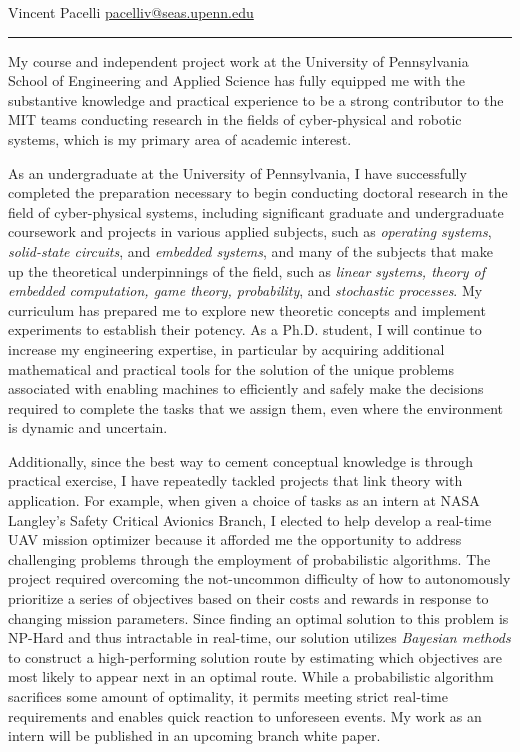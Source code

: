 \documentclass[11pt]{letter}
\title{}
\author{}
\begin{document}
\newcommand{\comm}[1]{}

Vincent Pacelli \hfill \hfill \href{mailto:pacelliv@seas.upenn.edu}{pacelliv@seas.upenn.edu}\\
\rule{\textwidth}{0.1pt}

My course and independent project work at the University of Pennsylvania School of Engineering and Applied Science has fully equipped me with the substantive knowledge and practical experience to be a strong contributor to the MIT teams conducting research in the fields of cyber-physical and robotic systems, which is my primary area of academic interest.

As an undergraduate at the University of Pennsylvania, I have successfully completed the preparation necessary to begin conducting doctoral research in the field of cyber-physical systems, including significant graduate and undergraduate coursework and projects in various applied subjects, such as \emph{operating systems}, \emph{solid-state circuits}, and \emph{embedded systems}, and many of the subjects that make up the theoretical underpinnings of the field, such as \emph{linear systems, theory of embedded computation, game theory, probability}, and \emph{stochastic processes}.  My curriculum has prepared me to explore new theoretic concepts and implement experiments to establish their potency.  As a Ph.D. student, I will continue to increase my engineering expertise, in particular by acquiring additional mathematical and practical tools for the solution of the unique problems associated with enabling machines to efficiently and safely make the decisions required to complete the tasks that we assign them, even where the environment is dynamic and uncertain.

Additionally, since the best way to cement conceptual knowledge is through practical exercise, I have repeatedly tackled projects that link theory with application. For example, when given a choice of tasks as an intern at NASA Langley’s Safety Critical Avionics Branch, I elected to help develop a real-time UAV mission optimizer because it afforded me the opportunity to address challenging problems through the employment of probabilistic algorithms.  The project required overcoming the not-uncommon difficulty of how to autonomously prioritize a series of objectives based on their costs and rewards in response to changing mission parameters. 
Since finding an optimal solution to this problem is NP-Hard and thus intractable in real-time, our solution utilizes \emph{Bayesian methods} to construct a high-performing solution route by estimating which objectives are most likely to appear next in an optimal route.  While a probabilistic algorithm sacrifices some amount of optimality, it permits meeting strict real‑time requirements and enables quick reaction to unforeseen events.  My work as an intern will be published in an upcoming branch white paper.
\end{document}
